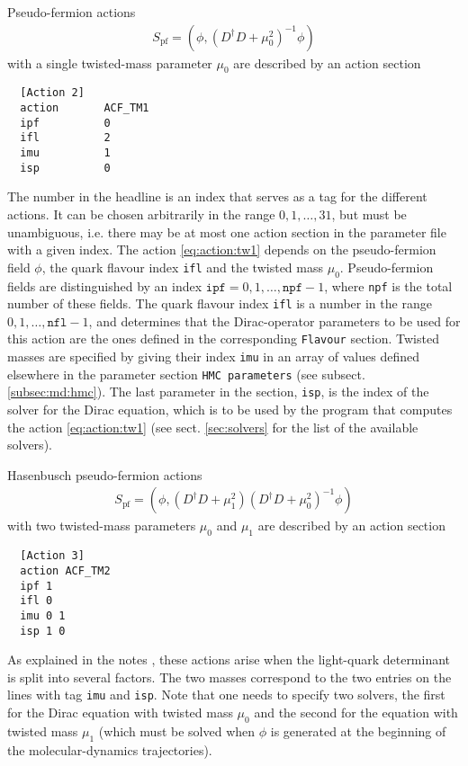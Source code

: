 \documentclass[11pt,fleqn]{article}
\begin{document}
Pseudo-fermion actions
%
\begin{gather}
   S_\text{pf} = ( \phi, (D^\dag D + \mu_0^2)^{-1} \phi )
   \label{eq:action:tw1}
\end{gather}
%
with a single twisted-mass parameter $\mu_0$ are described by an action section
%
\begin{verbatim}
  [Action 2]
  action       ACF_TM1
  ipf          0
  ifl          2
  imu          1
  isp          0
\end{verbatim}
%
The number in the headline is an index that serves as a tag for the different
actions. It can be chosen arbitrarily in the range $0,1,\dots,31$, but must be
unambiguous, i.e. there may be at most one action section in the parameter file
with a given index. The action \eqref{eq:action:tw1} depends on the
pseudo-fermion field $\phi$, the quark flavour index \texttt{ifl} and the
twisted mass $\mu_0$. Pseudo-fermion fields are distinguished by an index
$\texttt{ipf}=0,1,\dots,\texttt{npf}-1$, where \texttt{npf} is the total number
of these fields. The quark flavour index \texttt{ifl} is a number in the range
$0,1,\dots,\texttt{nfl}-1$, and determines that the Dirac-operator parameters to
be used for this action are the ones defined in the corresponding
\texttt{Flavour} section. Twisted masses are specified by giving their index
\texttt{imu} in an array of values defined elsewhere in the parameter section
\texttt{HMC parameters} (see subsect. \ref{subsec:md:hmc}). The last parameter in
the section, \texttt{isp}, is the index of the solver for the Dirac equation,
which is to be used by the program that computes the action
\eqref{eq:action:tw1} (see sect. \ref{sec:solvers} for the list of the available
solvers).

Hasenbusch pseudo-fermion actions
%
\begin{gather}
   S_\text{pf} = ( \phi, (D^\dag D + \mu_1^2) (D^\dag D + \mu_0^2)^{-1} \phi )
   \label{eq:action:tw2}
\end{gather}
%
with two twisted-mass parameters $\mu_0$ and $\mu_1$ are described by an action
section
%
\begin{verbatim}
  [Action 3]
  action ACF_TM2
  ipf 1
  ifl 0
  imu 0 1
  isp 1 0
\end{verbatim}
%
As explained in the notes \cite{openQCD:forces}, these actions arise when the
light-quark determinant is split into several factors. The two masses correspond
to the two entries on the lines with tag \texttt{imu} and \texttt{isp}. Note
that one needs to specify two solvers, the first for the Dirac equation with
twisted mass $\mu_0$ and the second for the equation with twisted mass $\mu_1$
(which must be solved when $\phi$ is generated at the beginning of the
molecular-dynamics trajectories).
\end{document}
